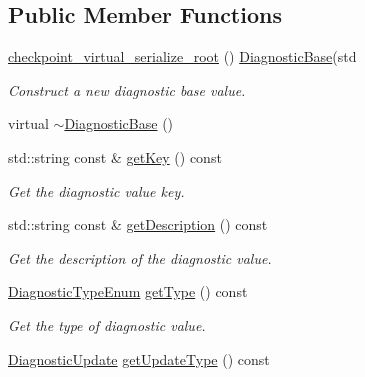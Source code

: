\subsection*{Public Member Functions}
\begin{DoxyCompactItemize}
\item 
\hyperlink{structvt_1_1runtime_1_1component_1_1detail_1_1_diagnostic_base_a8e9b40645156c8a30974003a79079376}{checkpoint\+\_\+virtual\+\_\+serialize\+\_\+root} () \hyperlink{structvt_1_1runtime_1_1component_1_1detail_1_1_diagnostic_base}{Diagnostic\+Base}(std
\begin{DoxyCompactList}\small\item\em Construct a new diagnostic base value. \end{DoxyCompactList}\item 
virtual \hyperlink{structvt_1_1runtime_1_1component_1_1detail_1_1_diagnostic_base_adc580177d32483d2166bdcdb9adfd832}{$\sim$\+Diagnostic\+Base} ()
\item 
std\+::string const  \& \hyperlink{structvt_1_1runtime_1_1component_1_1detail_1_1_diagnostic_base_a5d7fb1508e6828047c4d9818a5a77668}{get\+Key} () const
\begin{DoxyCompactList}\small\item\em Get the diagnostic value key. \end{DoxyCompactList}\item 
std\+::string const  \& \hyperlink{structvt_1_1runtime_1_1component_1_1detail_1_1_diagnostic_base_a06f3c0521173ab2a2a00a0819f742dfb}{get\+Description} () const
\begin{DoxyCompactList}\small\item\em Get the description of the diagnostic value. \end{DoxyCompactList}\item 
\hyperlink{namespacevt_1_1runtime_1_1component_af0bb99d9a054682217874bdc735ecac0}{Diagnostic\+Type\+Enum} \hyperlink{structvt_1_1runtime_1_1component_1_1detail_1_1_diagnostic_base_a64cc0d8f6d2c7117514d2756750c39c5}{get\+Type} () const
\begin{DoxyCompactList}\small\item\em Get the type of diagnostic value. \end{DoxyCompactList}\item 
\hyperlink{namespacevt_1_1runtime_1_1component_a896637e6e183a909a17bfd8d3943c206}{Diagnostic\+Update} \hyperlink{structvt_1_1runtime_1_1component_1_1detail_1_1_diagnostic_base_a8e43c10002b63cd3d3192103dcf44727}{get\+Update\+Type} () const

\end{DoxyCompactItemize}
